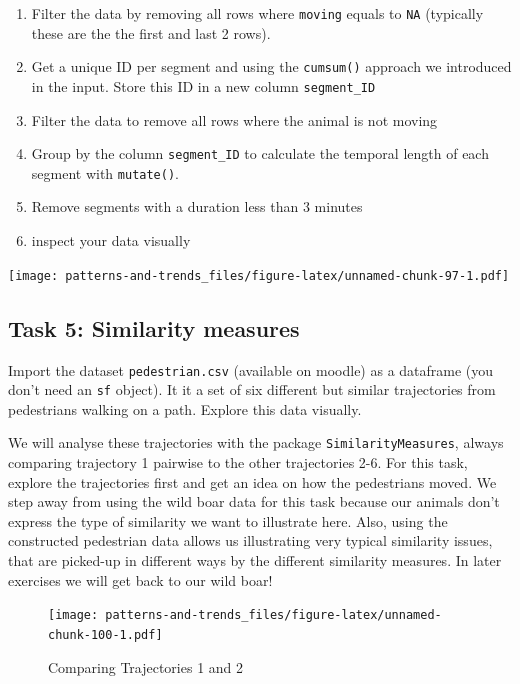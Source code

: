 \documentclass[]{book}
\providecommand{\tightlist}{%
  \setlength{\itemsep}{0pt}\setlength{\parskip}{0pt}}
\begin{document}
\begin{enumerate}
\def\labelenumi{\arabic{enumi}.}
\tightlist
\item
  Filter the data by removing all rows where \texttt{moving} equals to \texttt{NA} (typically these are the the first and last 2 rows).
\item
  Get a unique ID per segment and using the \texttt{cumsum()} approach we introduced in the input. Store this ID in a new column \texttt{segment\_ID}
\item
  Filter the data to remove all rows where the animal is not moving
\item
  Group by the column \texttt{segment\_ID} to calculate the temporal length of each segment with \texttt{mutate()}.
\item
  Remove segments with a duration less than 3 minutes
\item
  inspect your data visually
\end{enumerate}

\texttt{[image: patterns-and-trends\_files/figure-latex/unnamed-chunk-97-1.pdf]}

\hypertarget{task-5-similarity-measures}{%
\subsection{Task 5: Similarity measures}\label{task-5-similarity-measures}}

Import the dataset \texttt{pedestrian.csv} (available on moodle) as a dataframe (you don't need an \texttt{sf} object). It it a set of six different but similar trajectories from pedestrians walking on a path. Explore this data visually.

We will analyse these trajectories with the package \texttt{SimilarityMeasures}, always comparing trajectory 1 pairwise to the other trajectories 2-6. For this task, explore the trajectories first and get an idea on how the pedestrians moved. We step away from using the wild boar data for this task because our animals don't express the type of similarity we want to illustrate here. Also, using the constructed pedestrian data allows us illustrating very typical similarity issues, that are picked-up in different ways by the different similarity measures. In later exercises we will get back to our wild boar!

\begin{figure}
\centering
\texttt{[image: patterns-and-trends\_files/figure-latex/unnamed-chunk-100-1.pdf]}
\caption{\label{fig:unnamed-chunk-100}Comparing Trajectories 1 and 2}
\end{figure}
\end{document}
